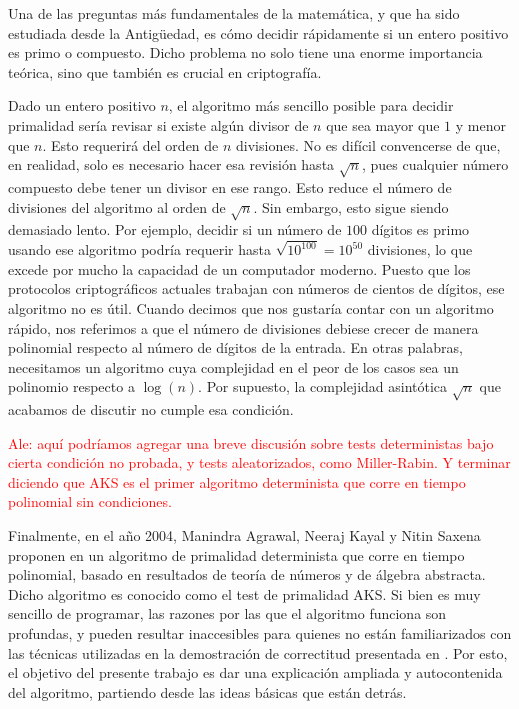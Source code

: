 Una de las preguntas más fundamentales de la matemática, y que ha sido estudiada desde la Antigüedad, es cómo decidir rápidamente si un entero positivo es primo o compuesto. Dicho problema no solo tiene una enorme importancia teórica, sino que también es crucial en criptografía.

Dado un entero positivo $n$, el algoritmo más sencillo posible para decidir primalidad sería revisar si existe algún divisor de $n$ que sea mayor que $1$ y menor que $n$. Esto requerirá del orden de $n$ divisiones. No es difícil convencerse de que, en realidad, solo es necesario hacer esa revisión hasta $\sqrt{n}$, pues cualquier número compuesto debe tener un divisor en ese rango. Esto reduce el número de divisiones del algoritmo al orden de $\sqrt{n}$. Sin embargo, esto sigue siendo demasiado lento. Por ejemplo, decidir si un número de $100$ dígitos es primo usando ese algoritmo podría requerir hasta $\sqrt{10^{100}} = 10^{50}$ divisiones, lo que excede por mucho la capacidad de un computador moderno. Puesto que los protocolos criptográficos actuales trabajan con números de cientos de dígitos, ese algoritmo no es útil. Cuando decimos que nos gustaría contar con un algoritmo rápido, nos referimos a que el número de divisiones debiese crecer de manera polinomial respecto al número de dígitos de la entrada. En otras palabras, necesitamos un algoritmo cuya complejidad en el peor de los casos sea un polinomio respecto a $\log(n)$. Por supuesto, la complejidad asintótica $\sqrt{n}$ que acabamos de discutir no cumple esa condición.


\textcolor{red}{Ale: aquí podríamos agregar una breve discusión sobre tests deterministas bajo cierta condición no probada, y tests aleatorizados, como Miller-Rabin. Y terminar diciendo que AKS es el primer algoritmo determinista que corre en tiempo polinomial sin condiciones.}


Finalmente, en el año 2004, Manindra Agrawal, Neeraj Kayal y Nitin Saxena proponen en \cite{AKS04} un algoritmo de primalidad determinista que corre en tiempo polinomial, basado en resultados de teorí­a de números y de álgebra abstracta. Dicho algoritmo es conocido como el test de primalidad AKS. Si bien es muy sencillo de programar, las razones por las que el algoritmo funciona son profundas, y pueden resultar inaccesibles para quienes no están familiarizados con las técnicas utilizadas en la demostración de correctitud presentada en \cite{AKS04}. Por esto, el objetivo del presente trabajo es dar una explicación ampliada y autocontenida del algoritmo, partiendo desde las ideas básicas que están detrás.
